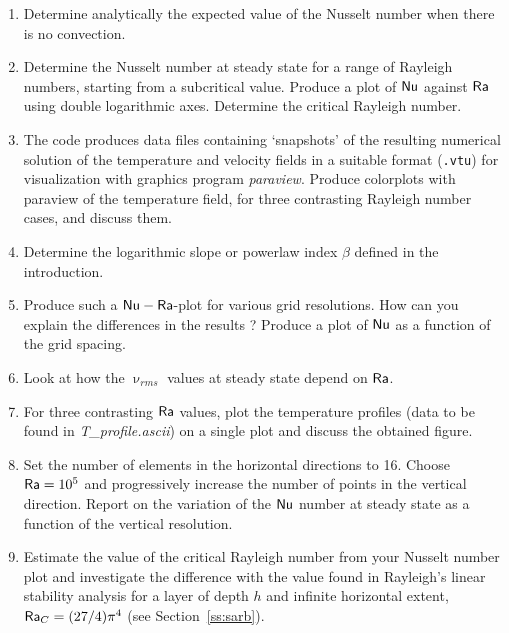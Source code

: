 \begin{enumerate}

\item Determine analytically the expected value of the Nusselt number when there is no convection.

\item Determine the Nusselt number at steady state for a range of Rayleigh numbers, 
starting from a subcritical value. 
Produce a plot of ${\mathsf{Nu}}$ against ${\mathsf{Ra}}$ using double logarithmic axes. 
Determine the critical Rayleigh number. 

\item The code produces data files containing `snapshots' of the resulting numerical solution 
of the temperature and velocity fields in a suitable format ({\tt .vtu}) for visualization with 
graphics program {\sl paraview}. 
Produce colorplots with paraview of the temperature field, for three contrasting Rayleigh number cases, 
and discuss them.

\item Determine the logarithmic slope or powerlaw index $\beta$ defined in the introduction.

\item Produce such a ${\mathsf{Nu}}-{\mathsf{Ra}}$-plot for various grid resolutions. 
How can you explain the differences in 
the results ? Produce a plot of ${\mathsf{Nu}}$ as a function of the grid spacing. 

\item Look at how the $\upnu_{rms}$ values at steady state depend on ${\mathsf{Ra}}$. 

\item For three contrasting ${\mathsf{Ra}}$ values, plot the temperature profiles 
(data to be found in {\sl T\_profile.ascii}) on a single plot and discuss the obtained figure.

\item Set the number of elements in the horizontal directions to 16. Choose ${\mathsf{Ra}}=10^5$ 
and progressively increase the number 
of points in the vertical direction. Report on the variation of the ${\mathsf{Nu}}$ number at steady 
state as a function of the vertical resolution.

\item Estimate the value of the critical Rayleigh number from your Nusselt number plot and 
investigate the difference with the value found in Rayleigh's linear stability analysis 
for a layer of depth $h$ and infinite horizontal extent, ${\mathsf{Ra}}_C = (27/4)  \pi^4$ 
(see Section~\ref{ss:sarb}).


\end{enumerate}
